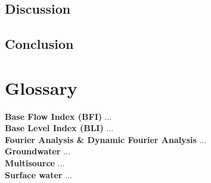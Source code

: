 \documentclass[DIV=calc, paper=a4, fontsize=11pt, twocolumn]{scrartcl}	 %
\begin{document}
	\subsection{Discussion}
	\subsection{Conclusion}
	
\section{Glossary}	
\textbf{Base Flow Index (BFI)} ...\\
\textbf{Base Level Index (BLI)} ...\\
\textbf{Fourier Analysis \& Dynamic Fourier Analysis} ...\\
\textbf{Groundwater} ...\\
\textbf{Multisource} ...\\
\textbf{Surface water} ...\\

{}


%

\end{document}
